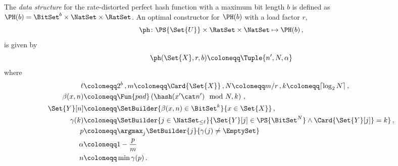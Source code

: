\documentclass[ ../main.tex]{subfiles}
\begin{document}
The \emph{data structure} for the rate-distorted perfect hash function with a maximum bit length $b$ is defined as $\PH(b) = \BitSet^{b} \times \NatSet \times \RatSet$.
An optimal constructor for $\PH(b)$ with a load factor $r$,
\begin{equation}
	\ph \colon \PS{\Set{U}} \times \RatSet \times \NatSet \mapsto \PH(b)\,,
\end{equation}
is given by
\begin{equation}
	\ph(\Set{X}, r, b) \coloneqq \Tuple{n',N, \alpha}
\end{equation}
where
\begin{equation}
\begin{split}
\ell		& \coloneqq 2^b\,, m \coloneqq \Card{\Set{X}}\,, N \coloneqq m / r\,, k \coloneqq \lceil \log_2 N \rceil\,,\\
\beta(x,n) 	& \coloneqq \Fun{pad}\left(\hash(x' \cat n') \mod N, k\right)\,,\\
\Set{Y}[n] 	& \coloneqq \SetBuilder{\beta(x,n) \in \BitSet^k}{x \in \Set{X}}\,,\\
\gamma(k)	& \coloneqq \SetBuilder{ j \in \NatSet_{\leq \ell} }{ \Set{Y}[j] \in \PS{\BitSet^N} \land \Card{\Set{Y}[j]} = k}\,,\\
p			& \coloneqq \argmax_j \SetBuilder{ j }{\gamma(j) \neq \EmptySet}\,\\
\alpha		& \coloneqq 1-\frac{p}{m}\,\\
n			& \coloneqq \min \gamma(p)\,.
\end{split}
\end{equation}
\end{document}
